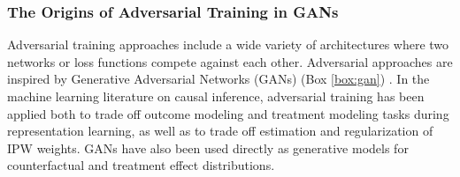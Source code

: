 \subsubsection{The Origins of Adversarial Training in GANs}
Adversarial training approaches include a wide variety of architectures where two networks or loss functions compete against each other. Adversarial approaches are inspired by Generative Adversarial Networks (GANs) (Box \ref{box:gan}) \citep{goodfellow2014generative}. In the machine learning literature on causal inference, adversarial training has been applied both to trade off outcome modeling and treatment modeling tasks during representation learning, as well as to trade off estimation and regularization of IPW weights. GANs have also been used directly as generative models for counterfactual and treatment effect distributions. 

